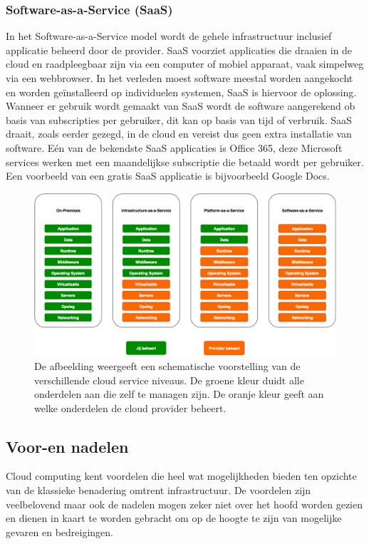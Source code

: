 \subsubsection{Software-as-a-Service (SaaS)}
In het Software-as-a-Service model wordt de gehele infrastructuur inclusief applicatie beheerd door de provider. SaaS voorziet applicaties die draaien in de cloud en raadpleegbaar zijn via een computer of mobiel apparaat, vaak simpelweg via een webbrowser. In het verleden moest software meestal worden aangekocht en worden geïnstalleerd op individuelen systemen, SaaS is hiervoor de oplossing. Wanneer er gebruik wordt gemaakt van SaaS wordt de software aangerekend ob basis van subscripties per gebruiker, dit kan op basis van tijd of verbruik. SaaS draait, zoals eerder gezegd, in de cloud en vereist dus geen extra installatie van software. Eén van de bekendste SaaS applicaties is Office 365, deze Microsoft services werken met een maandelijkse subscriptie die betaald wordt per gebruiker. Een voorbeeld van een gratis SaaS applicatie is bijvoorbeeld Google Docs.
\begin{figure}
    \includegraphics[width=1\textwidth]{img/cloud_service_level.png}
    \caption{De afbeelding weergeeft een schematische voorstelling van de verschillende cloud service niveaus. De groene kleur duidt alle onderdelen aan die zelf te managen zijn. De oranje kleur geeft aan welke onderdelen de cloud provider beheert.} 
    \label{fig:cloud-service-levels}  
\end{figure}
\newline

\subsection{Voor-en nadelen}
\label{voor-en-nadelen}
Cloud computing kent voordelen die heel wat mogelijkheden bieden ten opzichte van de klassieke benadering omtrent infrastructuur. \autocite{Azure2019} De voordelen zijn veelbelovend maar ook de nadelen mogen zeker niet over het hoofd worden gezien en dienen in kaart te worden gebracht om op de hoogte te zijn van mogelijke gevaren en bedreigingen.\autocite{Sosinsky2011} 

